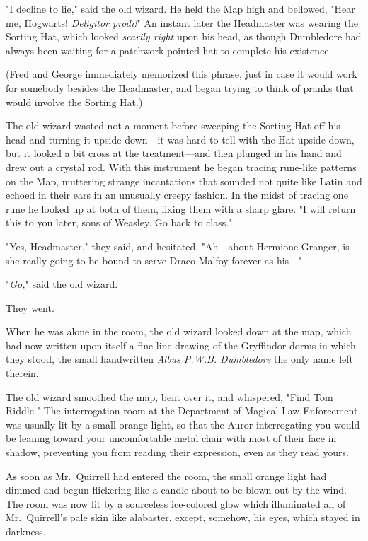 "I decline to lie," said the old wizard. He held the Map high and bellowed,
"Hear me, Hogwarts! \emph{Deligitor prodi!}" An instant later the Headmaster
was wearing the Sorting Hat, which looked \emph{scarily right} upon his head,
as though Dumbledore had always been waiting for a patchwork pointed hat to
complete his existence.

(Fred and George immediately memorized this phrase, just in case it would work
for somebody besides the Headmaster, and began trying to think of pranks that
would involve the Sorting Hat.)

The old wizard wasted not a moment before sweeping the Sorting Hat off his head
and turning it upside-down---it was hard to tell with the Hat upside-down, but
it looked a bit cross at the treatment---and then plunged in his hand and drew
out a crystal rod. With this instrument he began tracing rune-like patterns on
the Map, muttering strange incantations that sounded not quite like Latin and
echoed in their ears in an unusually creepy fashion. In the midst of tracing
one rune he looked up at both of them, fixing them with a sharp glare. "I will
return this to you later, sons of Weasley. Go back to class."

"Yes, Headmaster," they said, and hesitated. "Ah---about Hermione Granger, is
she really going to be bound to serve Draco Malfoy forever as his---"

"\emph{Go,}" said the old wizard.

They went.

When he was alone in the room, the old wizard looked down at the map, which had
now written upon itself a fine line drawing of the Gryffindor dorms in which
they stood, the small handwritten \emph{Albus P.W.B. Dumbledore} the only name
left therein.

The old wizard smoothed the map, bent over it, and whispered, "Find Tom Riddle."
\later
The interrogation room at the Department of Magical Law Enforcement was usually
lit by a small orange light, so that the Auror interrogating you would be
leaning toward your uncomfortable metal chair with most of their face in
shadow, preventing you from reading their expression, even as they read yours.

As soon as Mr.~Quirrell had entered the room, the small orange light had dimmed
and begun flickering like a candle about to be blown out by the wind. The room
was now lit by a sourceless ice-colored glow which illuminated all of
Mr.~Quirrell's pale skin like alabaster, except, somehow, his eyes, which
stayed in darkness.

